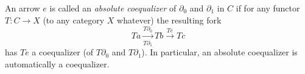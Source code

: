 An arrow $e$ is called an \emph{absolute coequalizer} of $\partial_0$ and $\partial_1$ in $C$ if for any functor $T: C \to X$ (to any category $X$ whatever) the resulting fork
$$T a \xrightarrow[T \partial_1]{T \partial_0} T b \xrightarrow{T e} T c$$
has $T e$ a coequalizer (of $T \partial_0$ and $T \partial_1$).
In particular, an absolute coequalizer is automatically a coequalizer.
